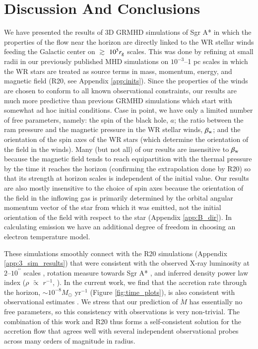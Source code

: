 \documentclass[twocolumn,twocolappendix,apjl,appendixfloats]{aastex63}
\begin{document}
\section{Discussion And Conclusions}
\label{sec:disc_conc}
We have presented the results of 3D GRMHD simulations of Sgr A* in which the properties of the flow near the horizon are directly linked to the WR stellar winds feeding the Galactic center on $\gtrsim$ $10^5 r_{\rm g}$ scales.  
This was done by refining at small radii in our previously published MHD simulations on $10^{-3}$--1 pc scales in which the WR stars are treated as source terms in mass, momentum, energy, and magnetic field (R20, see Appendix \ref{app:inits}).  Since the properties of the winds are chosen to conform to all known observational constraints, our results are much more predictive than previous GRMHD simulations which start with somewhat ad hoc initial conditions.  Case in point, we have only a limited number of free parameters, namely: the spin of the black hole, $a$; the ratio between the ram pressure and the magnetic pressure in the WR stellar winds, $\beta_{\rm w}$; and the orientation of the spin axes of the WR stars (which determine the orientation of the field in the winds).  Many (but not all) of our results are insensitive to $\beta_{\rm w}$ because the magnetic field tends to reach equipartition with the thermal pressure by the time it reaches the horizon (confirming the extrapolation done by R20) so that its strength at horizon scales is independent of the initial value.  Our results are also mostly insensitive to the choice of spin axes because the orientation of the field in the inflowing gas is primarily determined by the orbital angular momentum vector of the star from which it was emitted, not the initial orientation of the field with respect to the star (Appendix \ref{app:B_dir}).  In calculating emission we have an additional degree of freedom in choosing an electron temperature model.

These simulations smoothly connect with the R20 simulations (Appendix \ref{app:3_sim_results}) that were consistent with the observed X-ray luminosity at $2$--$10^{\prime\prime}$ scales \citep{Baganoff2003}, rotation measure towards Sgr A* \citep{Marrone2007,Bower2018}, and inferred density power law index ($\rho$ $\tilde \propto$ $r^{-1}$, \citealt{Gillessen2019}). In the current work,  we find that the accretion rate through the horizon, $\sim 10^{-8} M_\odot$ yr$^{-1}$ (Figure \ref{fig:time_plots}),  is also consistent with observational estimates \citep{Marrone2007}.  We stress that our prediction of $\dot M$ has essentially no free parameters, so this consistency with observations is very non-trivial.  The combination of this work and R20 thus forms a self-consistent solution for the accretion flow that agrees well with several independent observational probes across many orders of magnitude in radius.
\end{document}
